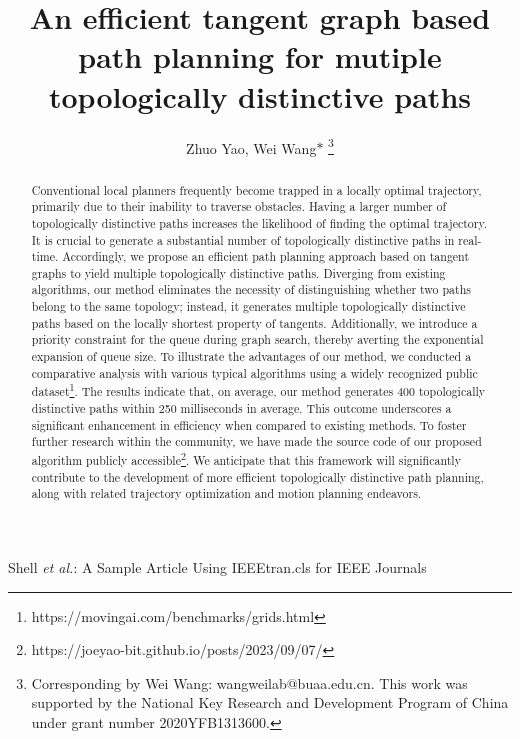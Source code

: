 \documentclass[lettersize,journal]{IEEEtran}
\begin{document}
\title{An efficient tangent graph based path planning for mutiple topologically distinctive paths}

\author{Zhuo Yao, Wei Wang$\ast$
\thanks{Corresponding by Wei Wang: wangweilab@buaa.edu.cn.
This work was supported by the National Key Research and Development Program of China under grant number 2020YFB1313600.}
}

%
{Shell \MakeLowercase{\textit{et al.}}: A Sample Article Using IEEEtran.cls for IEEE Journals}


\maketitle

\begin{abstract}
 
Conventional local planners frequently become trapped in a locally optimal trajectory, primarily due to their inability to traverse obstacles. Having a larger number of topologically distinctive paths increases the likelihood of finding the optimal trajectory. It is crucial to generate a substantial number of topologically distinctive paths in real-time. Accordingly, we propose an efficient path planning approach based on tangent graphs to yield multiple topologically distinctive paths. Diverging from existing algorithms, our method eliminates the necessity of distinguishing whether two paths belong to the same topology; instead, it generates multiple topologically distinctive paths based on the locally shortest property of tangents. Additionally, we introduce a priority constraint for the queue during graph search, thereby averting the exponential expansion of queue size. To illustrate the advantages of our method, we conducted a comparative analysis with various typical algorithms using a widely recognized public dataset\footnote{https://movingai.com/benchmarks/grids.html}. The results indicate that, on average, our method generates 400 topologically distinctive paths within 250 milliseconds in average. This outcome underscores a significant enhancement in efficiency when compared to existing methods. To foster further research within the community, we have made the source code of our proposed algorithm publicly accessible\footnote{https://joeyao-bit.github.io/posts/2023/09/07/}. We anticipate that this framework will significantly contribute to the development of more efficient topologically distinctive path planning, along with related trajectory optimization and motion planning endeavors.

\end{abstract}
\end{document}
